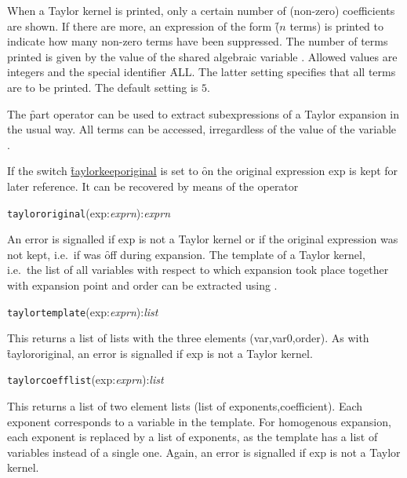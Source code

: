 \hypertarget{reserved:TAYLORPRINTTERMS}{}
When a Taylor kernel is printed, only a certain number of (non-zero)
coefficients are shown. If there are more, an expression of the form
\f{($n$ terms)} is printed to indicate how many non-zero
terms have been suppressed. The number of terms printed is given by
the value of the shared algebraic variable .
Allowed values are integers and the special identifier \f{ALL}. The
latter setting specifies that all terms are to be printed. The default
setting is $5$.

%
The \f{part} operator can be used to extract subexpressions of a
Taylor expansion in the usual way. All terms can be accessed,
irregardless of the value of the variable .


If the switch \hyperlink{switch:TAYLORKEEPORIGINAL}{\f{taylorkeeporiginal}}
is set to \f{on} the
original expression exp is kept for later reference.
It can be recovered by means of the operator

\hypertarget{operator:TAYLORORIGINAL}{}
\hspace*{2em} \texttt{taylororiginal}(exp:\emph{exprn}):\emph{exprn}

An error is signalled if exp is not a Taylor kernel or if the original
expression was not kept, i.e.\ if  was
\f{off} during expansion.  The template of a Taylor kernel, i.e.\
the list of all variables with respect to which expansion took place
together with expansion point and order can be extracted using
.

\hypertarget{operator:TAYLORTEMPLATE}{}
\hspace*{2em} \texttt{taylortemplate}(exp:\emph{exprn}):\emph{list}

This returns a list of lists with the three elements (var,var0,order).
As with \f{taylororiginal},
an error is signalled if exp is not a Taylor kernel.

\hypertarget{operator:TAYLORCOEFFLIST}{}
\hspace*{2em} \texttt{taylorcoefflist}(exp:\emph{exprn}):\emph{list}

This returns a list of two element lists (list of exponents,coefficient).
Each exponent corresponds to a variable in the template.
For homogenous expansion, each exponent is replaced by a list of exponents,
as the template has a list of variables instead of a single one.
Again, an error is signalled if exp is not a Taylor kernel.

